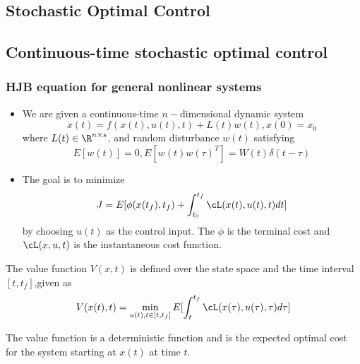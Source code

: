 \begin{refsection}

\chapter{Stochastic Optimal Control}\label{ch:stochastic-optimal-control}
\minitoc
\section{Continuous-time stochastic optimal control}
\subsection{HJB equation for general nonlinear systems}
\begin{definition}\cite[421]{stengel2012optimal}\hfill
	\begin{itemize}
		\item We are given a continuous-time $n-$dimensional dynamic system
		$$\dot{x}(t)  =  f(x(t),u(t),t) + L(t)w(t),x(0) = x_0$$
		where $L(t)\in \R^{n\times s}$, and random disturbance $w(t)$ satisfying 
		$$E[w(t)] = 0, E[w(t)w(\tau)^T] = W(t)\delta(t-\tau)$$
		\item The goal is to minimize
		$$J = E[\phi(x(t_f),t_f) + \int_{t_0}^{t_f} \cL(x(t),u(t),t) dt]$$
		by choosing $u(t)$ as the control input. The $\phi$ is the terminal cost and $\cL(x,u,t)$ is the instantaneous cost function.
	\end{itemize}
\end{definition}

\begin{definition}
The value function $V(x,t)$ is defined over the state space and the time interval $[t,t_f]$,given as
$$V(x(t),t) = \min_{u(t),t\in [t,t_f]} E[\int_t^{t_f} \cL(x(\tau),u(\tau),\tau) d\tau ]$$
\end{definition}

\begin{remark}[interpretation]
The value function is a deterministic function and  is the expected optimal cost for the system starting at $x(t)$ at time $t$. 
\end{remark}


\end{refsection}
